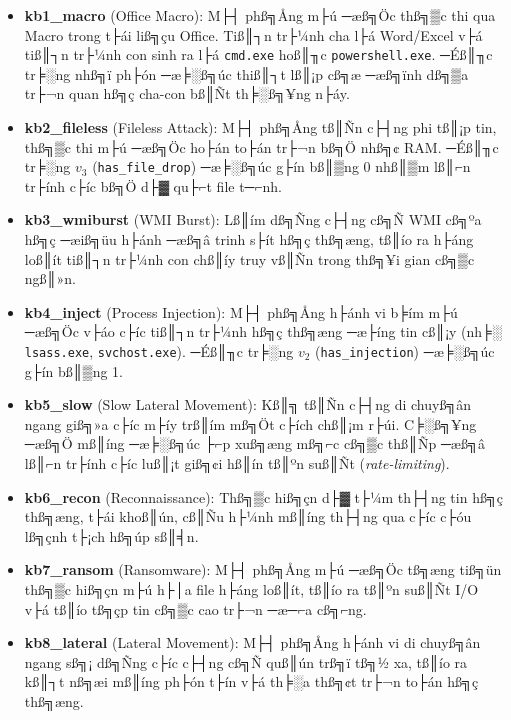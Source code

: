 ﻿\documentclass[../main.tex]{subfiles}
\begin{document}
\begin{itemize}
    \item \textbf{kb1\_macro} (Office Macro): M├┤ phß╗Ång m├ú ─æß╗Öc thß╗▒c thi qua Macro trong t├ái liß╗çu Office. Tiß║┐n tr├¼nh cha l├á Word/Excel v├á tiß║┐n tr├¼nh con sinh ra l├á \texttt{cmd.exe} hoß║╖c \texttt{powershell.exe}. ─Éß║╖c tr╞░ng nhß╗ï ph├ón ─æ╞░ß╗úc thiß║┐t lß║¡p cß╗æ ─æß╗ïnh dß╗▒a tr├¬n quan hß╗ç cha-con bß║Ñt th╞░ß╗¥ng n├áy.
    \item \textbf{kb2\_fileless} (Fileless Attack): M├┤ phß╗Ång tß║Ñn c├┤ng phi tß║¡p tin, thß╗▒c thi m├ú ─æß╗Öc ho├án to├án tr├¬n bß╗Ö nhß╗¢ RAM. ─Éß║╖c tr╞░ng $v_3$ (\texttt{has\_file\_drop}) ─æ╞░ß╗úc g├ín bß║▒ng 0 nhß║▒m lß║⌐n tr├ính c├íc bß╗Ö d├▓ qu├⌐t file t─⌐nh.
    \item \textbf{kb3\_wmiburst} (WMI Burst): Lß║ím dß╗Ñng c├┤ng cß╗Ñ WMI cß╗ºa hß╗ç ─æiß╗üu h├ánh ─æß╗â trinh s├ít hß╗ç thß╗æng, tß║ío ra h├áng loß║ít tiß║┐n tr├¼nh con chß║íy truy vß║Ñn trong thß╗¥i gian cß╗▒c ngß║»n.
    \item \textbf{kb4\_inject} (Process Injection): M├┤ phß╗Ång h├ánh vi b╞ím m├ú ─æß╗Öc v├áo c├íc tiß║┐n tr├¼nh hß╗ç thß╗æng ─æ├íng tin cß║¡y (nh╞░ \texttt{lsass.exe}, \texttt{svchost.exe}). ─Éß║╖c tr╞░ng $v_2$ (\texttt{has\_injection}) ─æ╞░ß╗úc g├ín bß║▒ng 1.
    \item \textbf{kb5\_slow} (Slow Lateral Movement): Kß║╗ tß║Ñn c├┤ng di chuyß╗ân ngang giß╗»a c├íc m├íy trß║ím mß╗Öt c├ích chß║¡m r├úi. C╞░ß╗¥ng ─æß╗Ö mß║íng ─æ╞░ß╗úc ├⌐p xuß╗æng mß╗⌐c cß╗▒c thß║Ñp ─æß╗â lß║⌐n tr├ính c├íc luß║¡t giß╗¢i hß║ín tß║ºn suß║Ñt (\textit{rate-limiting}).
    \item \textbf{kb6\_recon} (Reconnaissance): Thß╗▒c hiß╗çn d├▓ t├¼m th├┤ng tin hß╗ç thß╗æng, t├ái khoß║ún, cß║Ñu h├¼nh mß║íng th├┤ng qua c├íc c├óu lß╗çnh t├¡ch hß╗úp sß║╡n.
    \item \textbf{kb7\_ransom} (Ransomware): M├┤ phß╗Ång m├ú ─æß╗Öc tß╗æng tiß╗ün thß╗▒c hiß╗çn m├ú h├│a file h├áng loß║ít, tß║ío ra tß║ºn suß║Ñt I/O v├á tß║ío tß╗çp tin cß╗▒c cao tr├¬n ─æ─⌐a cß╗⌐ng.
    \item \textbf{kb8\_lateral} (Lateral Movement): M├┤ phß╗Ång h├ánh vi di chuyß╗ân ngang sß╗¡ dß╗Ñng c├íc c├┤ng cß╗Ñ quß║ún trß╗ï tß╗½ xa, tß║ío ra kß║┐t nß╗æi mß║íng ph├ón t├ín v├á th╞░a thß╗¢t tr├¬n to├án hß╗ç thß╗æng.
\end{itemize}
\end{document}
